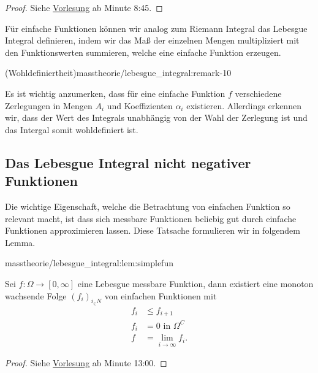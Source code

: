 \documentclass[letterpaper,10pt,german]{jupyterBook}
\begin{document}
\begin{proof}
 Siehe \href{https://www.fau.tv/clip/id/40589}{Vorlesung} ab Minute 8:45.
\end{proof}

\par
Für einfache Funktionen können wir analog zum Riemann Integral das Lebesgue Integral definieren, indem wir das Maß der einzelnen Mengen multipliziert mit den Funktionswerten summieren, welche eine einfache Funktion erzeugen.
\begin{remark}{(Wohldefiniertheit)}{masstheorie/lebesgue_integral:remark-10}



\par
Es ist wichtig anzumerken, dass für eine einfache Funktion \(f\) verschiedene Zerlegungen in Mengen \(A_i\) und Koeffizienten \(\alpha_i\) existieren. Allerdings erkennen wir, dass der Wert des Integrals unabhängig von der Wahl der Zerlegung ist und das Intergal somit wohldefiniert ist.
\end{remark}


\subsection{Das Lebesgue Integral nicht negativer Funktionen}
\label{\detokenize{masstheorie/lebesgue_integral:das-lebesgue-integral-nicht-negativer-funktionen}}
\par
Die wichtige Eigenschaft, welche die Betrachtung von einfachen Funktion so relevant macht, ist dass sich messbare Funktionen beliebig gut durch einfache Funktionen approximieren lassen. Diese Tatsache formulieren wir in folgendem Lemma.
\begin{lemma}{}{masstheorie/lebesgue_integral:lem:simplefun}



\par
Sei \(f \colon \Omega \to [0,\infty]\) eine Lebesgue messbare Funktion, dann existiert eine monoton wachsende Folge \((f_i)_{i_\in N}\) von einfachen Funktionen mit
\begin{align*}
f_i&\leq f_{i+1}\\
f_i &= 0\text{ in }\Omega^C\\
f&=\lim_{i\to\infty} f_i.
\end{align*}\end{lemma}

\begin{proof}
 Siehe \href{https://www.fau.tv/clip/id/40589}{Vorlesung} ab Minute 13:00.
\end{proof}
\end{document}

